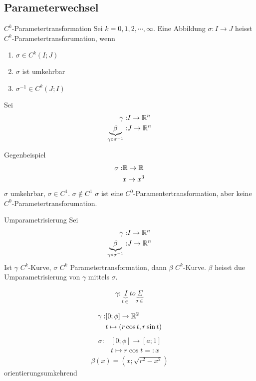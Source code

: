 \subsection{Parameterwechsel}
\begin{Def}{$C^k$-Parametertransformation}
  Sei $k=0,1,2,\cdots,\infty$. Eine Abbildung $\sigma:I\to J$ heisst $C^k$-Parametertransforumation, wenn
  \begin{enumerate}
    \item $\sigma\in C^k(I;J)$
    \item $\sigma$ ist umkehrbar
    \item $\sigma^{-1}\in C^k(J;I)$
  \end{enumerate}
  Sei 
  \begin{align*}
    \gamma:&I\to\mathbb{R}^n\\
    \underbrace{\beta}_{\gamma\circ\sigma^{-1}}:&J\to\mathbb{R}^n
  \end{align*}
\end{Def}
\begin{Bsp}{Gegenbeispiel}
  \begin{align*}
    \sigma:&\mathbb{R}\to\mathbb{R}\\
    &x\mapsto x^3
  \end{align*}
  $\sigma$ umkehrbar, $\sigma\in C^1$. $\sigma\not\in C^1$ $\sigma$ ist eine $C^0$-Paramentertransformation, aber keine $C^0$-Parametertransforumation.
\end{Bsp}
\begin{Def}{Umparametrisierung}
  Sei 
  \begin{align*}
    \gamma:&I\to\mathbb{R}^n\\
    \underbrace{\beta}_{\gamma\circ\sigma^{-1}}:&J\to\mathbb{R}^n
  \end{align*}
  Ist $\gamma$ $C^k$-Kurve, $\sigma$ $C^k$ Parametertransformation, dann $\beta$ $C^k$-Kurve. $\beta$ heisst due Umparametrisierung von $\gamma$ mittels $\sigma$.
\end{Def}
\begin{Not}
  \begin{align*}
    \gamma:\underbrace{I}_{t\in}to\underbrace{\Sigma}_{\sigma \in}
  \end{align*}
\end{Not}
\begin{Bsp}
  \begin{align*}
    \gamma:&[0;\phi]\to\mathbb{R}^2\\
    &t\mapsto(r\cos t, r\sin t)
  \end{align*}
  \begin{align*}
    \sigma:&[0;\phi]\to[a;1]\\
    &t\mapsto r\cos t=: x
  \end{align*}
  \begin{align*}
    \beta(x)=\left( x;\sqrt{r^2-x^2} \right)
  \end{align*}
  orientierungsumkehrend
\end{Bsp}
